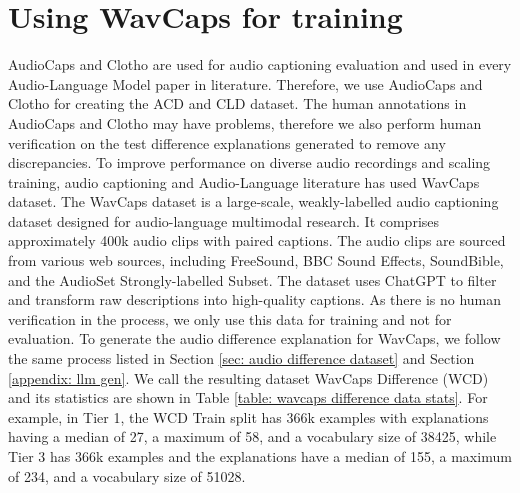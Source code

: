 \section{Using WavCaps for training}
AudioCaps \cite{audiocaps} and Clotho \cite{clotho} are used for audio captioning evaluation and used in every Audio-Language Model paper \cite{mspengi, ghosh2024gama, ltu, ltuas, qwenaudio, salmonn} in literature. Therefore, we use AudioCaps \cite{audiocaps} and Clotho \cite{clotho} for creating the ACD and CLD dataset. The human annotations in AudioCaps and Clotho may have problems, therefore we also perform human verification on the test difference explanations generated to remove any discrepancies. To improve performance on diverse audio recordings and scaling training, audio captioning and Audio-Language literature has used WavCaps \cite{wavcaps} dataset. The WavCaps dataset is a large-scale, weakly-labelled audio captioning dataset designed for audio-language multimodal research. It comprises approximately 400k audio clips with paired captions. The audio clips are sourced from various web sources, including FreeSound, BBC Sound Effects, SoundBible, and the AudioSet Strongly-labelled Subset. The dataset uses ChatGPT to filter and transform raw descriptions into high-quality captions. As there is no human verification in the process, we only use this data for training and not for evaluation. To generate the audio difference explanation for WavCaps, we follow the same process listed in Section \ref{sec: audio difference dataset} and Section \ref{appendix: llm gen}. We call the resulting dataset WavCaps Difference (WCD) and its statistics are shown in Table \ref{table: wavcaps difference data stats}. For example, in Tier 1, the WCD Train split has 366k examples with explanations having a median of 27, a maximum of 58, and a vocabulary size of 38425, while Tier 3 has 366k examples and the explanations have a median of 155, a maximum of 234, and a vocabulary size of 51028. 

